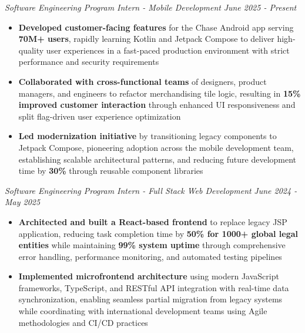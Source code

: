 \documentclass[letterpaper]{article}
\newenvironment{tightitemize}{%
  \begin{itemize}\small\setlength{\baselineskip}{0.95\baselineskip}\itemsep -1mm%
}{\end{itemize}}
\begin{document}
    \textit{Software Engineering Program Intern - Mobile Development} \hfill \textsl{June 2025 - Present}\\
    \vspace{-7pt}
    \begin{tightitemize} \itemsep -1mm

            \item \textbf{Developed customer-facing features} for the Chase Android app serving \textbf{70M+ users}, rapidly learning Kotlin and Jetpack Compose to deliver high-quality user experiences in a fast-paced production environment with strict performance and security requirements

            \item \textbf{Collaborated with cross-functional teams} of designers, product managers, and engineers to refactor merchandising tile logic, resulting in \textbf{15\% improved customer interaction} through enhanced UI responsiveness and split flag-driven user experience optimization

            \item \textbf{Led modernization initiative} by transitioning legacy components to Jetpack Compose, pioneering adoption across the mobile development team, establishing scalable architectural patterns, and reducing future development time by \textbf{30\%} through reusable component libraries
                    
    \end{tightitemize}
    \textit{Software Engineering Program Intern - Full Stack Web Development} \hfill \textsl{June 2024 - May 2025}\\
    \vspace{-7pt}
    \begin{tightitemize} \itemsep -1mm

            \item \textbf{Architected and built a React-based frontend} to replace legacy JSP application, reducing task completion time by \textbf{50\% for 1000+ global legal entities} while maintaining \textbf{99\% system uptime} through comprehensive error handling, performance monitoring, and automated testing pipelines

            \item \textbf{Implemented microfrontend architecture} using modern JavaScript frameworks, TypeScript, and RESTful API integration with real-time data synchronization, enabling seamless partial migration from legacy systems while coordinating with international development teams using Agile methodologies and CI/CD practices
                    
    \end{tightitemize}
    \vspace{-2mm}
\end{document}
